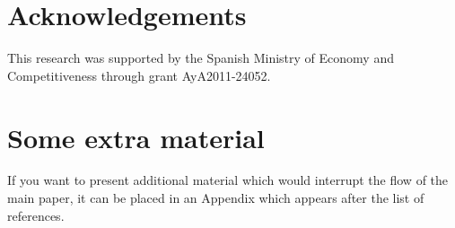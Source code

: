 \documentclass[a4paper,fleqn,usenatbib]{mnras}
\begin{document}
\section*{Acknowledgements}
This research was supported by the Spanish Ministry of Economy and Competitiveness through grant AyA2011-24052. 












\appendix

\section{Some extra material}

If you want to present additional material which would interrupt the flow of the main paper,
it can be placed in an Appendix which appears after the list of references.



\bsp	%
\label{lastpage}
\end{document}
